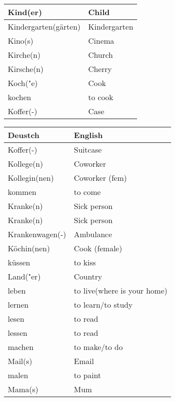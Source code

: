 \documentclass{article}
\renewcommand{\arraystretch}{1}
\begin{document}
\begin{minipage}{0.48\textwidth}
\begin{tabular}{|>{\raggedright\arraybackslash}p{3.5cm}|>{\raggedright\arraybackslash}p{3.5cm}|}
        Kind(er) & Child \\\hline
        Kindergarten(gärten) & Kindergarten \\\hline
        Kino(s) & Cinema \\\hline
        Kirche(n) & Church \\\hline
        Kirsche(n) & Cherry \\\hline
        Koch("e) & Cook \\\hline
        kochen & to cook \\\hline
        Koffer(-) & Case \\\hline
    \end{tabular}
\end{minipage}

\newpage

\begin{minipage}{0.48\textwidth}
    \centering
    \renewcommand{\arraystretch}{1.5}
    \begin{tabular}{|>{\raggedright\arraybackslash}p{3.5cm}|>{\raggedright\arraybackslash}p{3.5cm}|}
        \hline
        \rowcolor{gray!20} \textbf{Deustch} & \textbf{English} \\
        \hline
        Koffer(-) & Suitcase \\\hline
        Kollege(n) & Coworker \\\hline
        Kollegin(nen) & Coworker (fem) \\\hline
        kommen & to come \\\hline
        Kranke(n) & Sick person \\\hline
        Kranke(n) & Sick person \\\hline
        Krankenwagen(-) & Ambulance \\\hline
        Köchin(nen) & Cook (female) \\\hline
        küssen & to kiss \\\hline
        Land("er) & Country \\\hline
        leben & to live(where is your home) \\\hline
        lernen & to learn/to study \\\hline
        lesen & to read \\\hline
        lessen & to read \\\hline
        machen & to make/to do \\\hline
        Mail(s) & Email \\\hline
        malen & to paint \\\hline
        Mama(s) & Mum \\\hline

\end{tabular}
\end{minipage}
\end{document}
